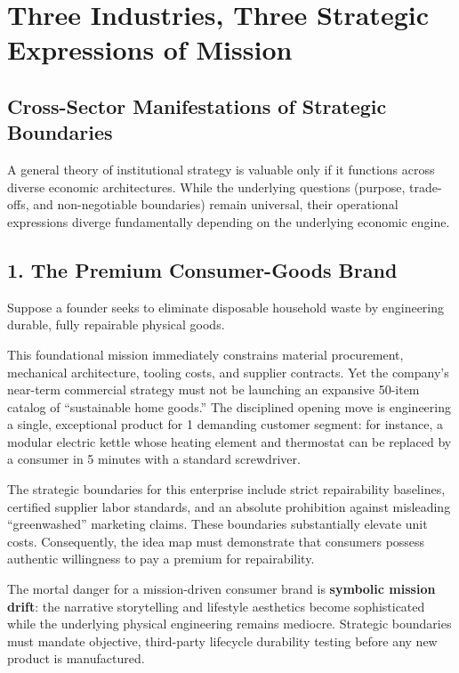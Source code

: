 \section{Three Industries, Three Strategic Expressions of Mission}

\subsection{Cross-Sector Manifestations of Strategic Boundaries}

A general theory of institutional strategy is valuable only if it functions across diverse economic architectures. While the underlying questions (purpose, trade-offs, and non-negotiable boundaries) remain universal, their operational expressions diverge fundamentally depending on the underlying economic engine.

\subsection{1. The Premium Consumer-Goods Brand}

Suppose a founder seeks to eliminate disposable household waste by engineering durable, fully repairable physical goods.

This foundational mission immediately constrains material procurement, mechanical architecture, tooling costs, and supplier contracts. Yet the company's near-term commercial strategy must not be launching an expansive 50-item catalog of ``sustainable home goods.'' The disciplined opening move is engineering a single, exceptional product for 1 demanding customer segment: for instance, a modular electric kettle whose heating element and thermostat can be replaced by a consumer in 5 minutes with a standard screwdriver.

The strategic boundaries for this enterprise include strict repairability baselines, certified supplier labor standards, and an absolute prohibition against misleading ``greenwashed'' marketing claims. These boundaries substantially elevate unit costs. Consequently, the idea map must demonstrate that consumers possess authentic willingness to pay a premium for repairability.

The mortal danger for a mission-driven consumer brand is \textbf{symbolic mission drift}: the narrative storytelling and lifestyle aesthetics become sophisticated while the underlying physical engineering remains mediocre. Strategic boundaries must mandate objective, third-party lifecycle durability testing before any new product is manufactured.

